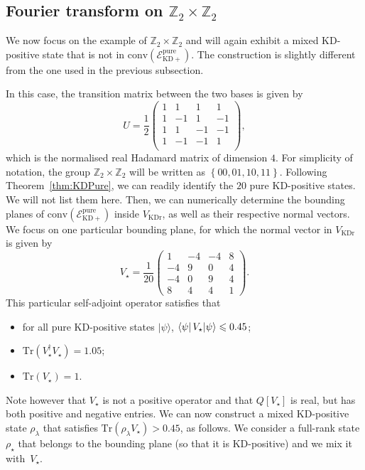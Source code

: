 \documentclass[a4paper, notitlepage, 11pt]{article}
\numberwithin{equation}{section}
\newcommand{\cket}[1]{|#1\rangle}
\newcommand{\mcl}[1]{\ensuremath{\mathcal{#1}}}
\newcommand{\EcalKDCpu}{{\mcl E}_{\mathrm{KD+}}^{\mathrm{pure}}}
\newcommand{\Z}{\mathbb{Z}}
\newcommand{\conv}[1]{\mathrm{conv}\left(#1\right)}
\newcommand{\VR}{V_{\mathrm{KDr}}}
\begin{document}
\subsection{Fourier transform on $\Z_{2}\times \Z_{2}$}
We now focus on the example of $\Z_{2}\times \Z_{2}$ and will again exhibit a mixed KD-positive state that is not in $\conv{\EcalKDCpu}$. The construction is slightly different from the one used in the previous subsection.  

In this case, the transition matrix between the two bases is given by
\[
U = \frac{1}{2}\begin{pmatrix}
    1 & 1 & 1 & 1 \\
    1 & -1 & 1 & -1 \\
    1 & 1 & -1 & -1 \\
    1 & -1 & -1 & 1 \\
\end{pmatrix},
\]
which is the normalised real Hadamard matrix of dimension $4$. For simplicity of notation, the group $\Z_{2}\times \Z_{2}$ will be written as $\left\{ 00,01,10,11\right\}$. Following Theorem~\ref{thm:KDPure}, we can readily identify the $20$ pure KD-positive states. We will not list them here. Then, we can numerically determine the bounding planes of $\conv{\EcalKDCpu}$ inside $\VR$, as well as their respective normal vectors. We focus on one particular bounding plane, for which the normal vector in $\VR$ is given by
\[
V_{\star} = \frac{1}{20} \begin{pmatrix}
    1 & -4 & -4 & 8 \\
    -4 & 9 & 0 & 4 \\
    -4 & 0 & 9 & 4 \\
    8 & 4 & 4 & 1
\end{pmatrix}.
\]
This particular self-adjoint operator satisfies that
\begin{itemize}[leftmargin=*]
    \item[$\bullet$] for all pure KD-positive  states $\cket{\psi}$, $\bra{\psi}V_{\star}\cket{\psi}\leqslant 0.45$;
    \item[$\bullet$] $\mathrm{Tr}(V_{\star}^{\dagger} V_{\star}) = 1.05$;
    \item[$\bullet$] $\mathrm{Tr}(V_{\star}) = 1$.
\end{itemize}
Note however that $V_{\star}$ is not a positive operator and that $Q[V_{\star}]$ is real, but has both positive and negative entries. 
We can now construct a mixed KD-positive state $\rho_\lambda$ that satisfies $\mathrm{Tr}(\rho_{\lambda} V_{\star}) > 0.45$, as follows. We consider a full-rank state $\rho_{\star}$ that belongs to the bounding plane (so that it is KD-positive) and we mix it with~$V_{\star}$.
\end{document}
